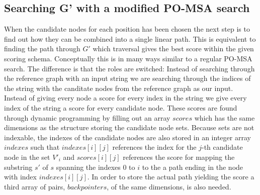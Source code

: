 \documentclass{article}
\begin{document}
\subsection{Searching G' with a modified PO-MSA search}
When the candidate nodes for each position has been chosen the next step is to find out how they can be combined into a single linear path. This is equivalent to finding the path through $G'$ which traversal gives the best score within the given scoring schema. Conceptually this is in many ways similar to a regular PO-MSA search. The difference is that the roles are switched: Instead of searching through the reference graph with an input string we are searching through the indices of the string with the canditate nodes from the reference graph as our input. Instead of giving every node a score for every index in the string we give every index of the string a score for every candidate node. These scores are found through dynamic programming by filling out an array $scores$ which has the same dimensions as the structure storing the candidate node sets. Because sets are not indexable, the indexes of the candidate nodes are also stored in an integer array $indexes$ such that $indexes[i][j]$ references the index for the $j$-th candidate node in the set $V'_i$  and $scores[i][j]$ references the score for mapping the substring $s'$ of $s$ spanning the indexes 0 to $i$ to the a path ending in the node with index $indexes[i][j]$. In order to store the actual path yielding the score a third array of pairs, $backpointers$, of the same dimensions, is also needed.\\
\par\noindent
\end{document}
